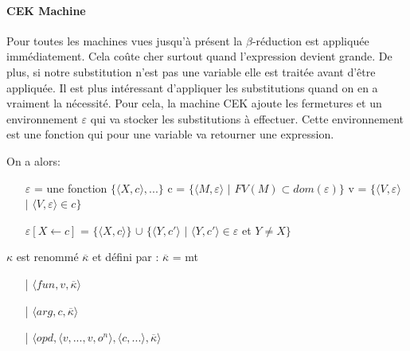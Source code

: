 \documentclass[10pt,a4paper]{report}
\begin{document}
\paragraph{CEK Machine}

Pour toutes les machines vues jusqu'à présent la $\beta$-réduction est appliquée immédiatement. Cela coûte cher surtout quand l'expression devient grande. De plus, si notre substitution n'est pas une variable elle est traitée avant d'être appliquée.
\smallbreak
Il est plus intéressant d'appliquer les substitutions quand on en a vraiment la nécessité. Pour cela, la machine CEK ajoute les fermetures et un environnement $\varepsilon$ qui va stocker les substitutions à effectuer. Cette environnement est une fonction qui pour une variable va retourner une expression.
\medbreak

On a alors:
\begin{itemize}
\item[] $\varepsilon$ = une fonction $\{\langle X,c\rangle,...\}$    c = $\{\langle M,\varepsilon\rangle$ $|$ $FV(M)\subset dom(\varepsilon)\}$    v = $\{\langle V,\varepsilon\rangle$ $|$ $\langle V,\varepsilon\rangle \in c\}$
\item[] $\varepsilon[X \leftarrow c]$ = $\{\langle X,c\rangle\}$ $\cup$ $\{\langle Y,c'\rangle$ $|$ $\langle Y,c'\rangle \in \varepsilon$ et $ Y \neq X\}$
\end{itemize}
\medbreak

$\kappa$ est renommé $\overline{\kappa}$ et défini par :
\smallbreak
$\overline{\kappa}$ = mt
\begin{itemize}
\item[|] $\langle fun,v,\overline{\kappa} \rangle$
\item[|] $\langle arg,c,\overline{\kappa} \rangle$
\item[|] $\langle opd,\langle v,...,v,o^{n}\rangle,\langle c,... \rangle,\overline{\kappa} \rangle$
\end{itemize}
\bigbreak
\end{document}
